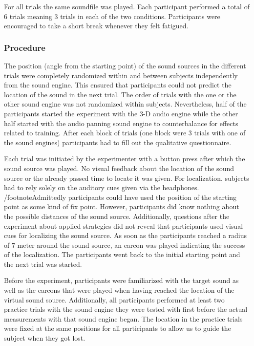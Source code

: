 \documentclass[journal]{IEEEtran}
\begin{document}
For all trials the same soundfile was played. Each participant performed a total of 6 trials meaning 3 trials in each of the two conditions. Participants were encouraged to take a short break whenever they felt fatigued.

\subsubsection{Procedure}
The position (angle from the starting point) of the sound sources in the different trials were completely randomized within and between subjects independently from the sound engine. This ensured that participants could not predict the location of the sound in the next trial. The order of trials with the one or the other sound engine was not randomized within subjects. Nevertheless, half of the participants started the experiment with the 3-D audio engine while the other half started with the audio panning sound engine to counterbalance for effects related to training. After each block of trials (one block were 3 trials with one of the sound engines) participants had to fill out the qualitative questionnaire.

Each trial was initiated by the experimenter with a button press after which the sound source was played. No visual feedback about the location of the sound source or the already passed time to locate it was given. For localization, subjects had to rely solely on the auditory cues given via the headphones. /footnote{Admittedly participants could have used the position of the starting point as some kind of fix point. However, participants did know nothing about the possible distances of the sound source. Additionally, questions after the experiment about applied strategies did not reveal that participants used visual cues for localizing the sound source.} As soon as the participants reached a radius of 7 meter around the sound source, an earcon was played indicating the success of the localization. The participants went back to the initial starting point and the next trial was started.

Before the experiment, participants were familiarized with the target sound as well as the earcons that were played when having reached the location of the virtual sound source. Additionally, all participants performed at least two practice trials with the sound engine they were tested with first before the actual measurements with that sound engine began. The location in the practice trials were fixed at the same positions for all participants to allow us to guide the subject when they got lost. 
\end{document}

